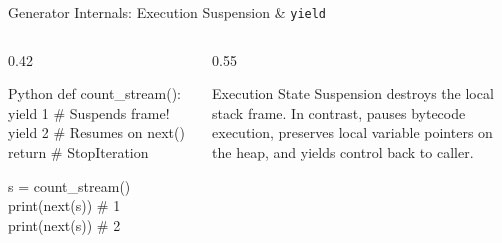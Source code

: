 \begin{frame}[fragile]{Generator Internals: Execution Suspension \& \texttt{yield}}
  \begin{columns}[T,onlytextwidth]
    \begin{column}{0.42\textwidth}
      \begin{CodeBlock}{Python}
def count_stream():
    yield 1 # Suspends frame!
    yield 2 # Resumes on next()
    return  # StopIteration

s = count_stream()
print(next(s)) # 1
print(next(s)) # 2
      \end{CodeBlock}
    \end{column}
    \begin{column}{0.55\textwidth}
      \begin{ConceptBox}{Execution State Suspension}
        \scriptsize
         destroys the local stack frame. In contrast,  pauses bytecode execution, preserves local variable pointers on the heap, and yields control back to caller.
      \end{ConceptBox}
      \vspace{0.08cm}
      \centering
      \DrawGeneratorLifecycle
    \end{column}
  \end{columns}
\end{frame}


